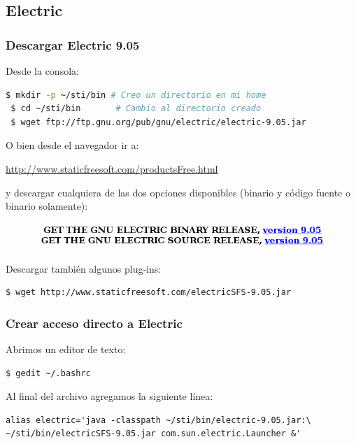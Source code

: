\documentclass{beamer}
\begin{document}
\subsection{Electric}
\begin{frame}[fragile]
\frametitle{Descargar Electric 9.05}

\noindent Desde la consola:
\begin{scriptsize}
\begin{lstlisting}[language=bash]
 $ mkdir -p ~/sti/bin # Creo un directorio en mi home
 $ cd ~/sti/bin	      # Cambio al directorio creado
 $ wget ftp://ftp.gnu.org/pub/gnu/electric/electric-9.05.jar
\end{lstlisting}
\end{scriptsize}

O bien desde el navegador ir a:

 \url{http://www.staticfreesoft.com/productsFree.html}

y descargar cualquiera de las dos opciones disponibles (binario y código fuente o binario solamente):
\begin{figure}
\includegraphics[width=0.8\linewidth]{figuras/downloadElectric.png}
\end{figure}
Descargar también algunos plug-ins:
\begin{scriptsize}
\begin{lstlisting}[language=bash]
 $ wget http://www.staticfreesoft.com/electricSFS-9.05.jar
\end{lstlisting}
\end{scriptsize}
\end{frame}


\begin{frame}[fragile]
\frametitle{Crear acceso directo a Electric}

\noindent Abrimos un editor de texto:
\begin{footnotesize}
\begin{lstlisting}[language=bash]
 $ gedit ~/.bashrc
\end{lstlisting}
Al final del archivo agregamos la siguiente línea:
\begin{verbatim}
alias electric='java -classpath ~/sti/bin/electric-9.05.jar:\
~/sti/bin/electricSFS-9.05.jar com.sun.electric.Launcher &'
\end{verbatim}
\end{footnotesize}

\end{frame}
\end{document}
